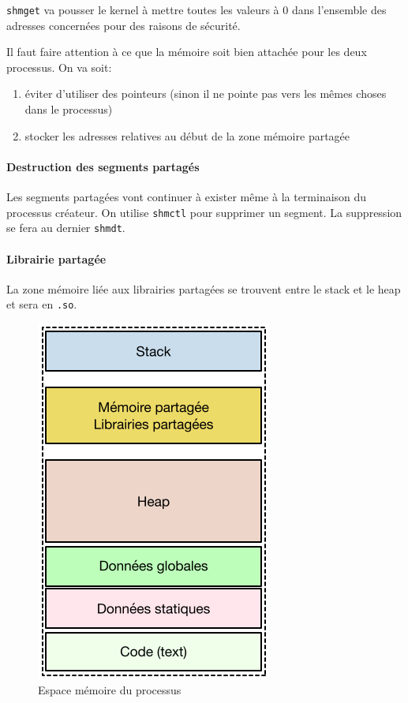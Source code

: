 \texttt{shmget} va pousser le kernel à mettre toutes les valeurs à 0
dans l'ensemble des adresses concernées pour des raisons de sécurité.

Il faut faire attention à ce que la mémoire soit bien attachée pour les
deux processus. On va soit:

\begin{enumerate}
\def\labelenumi{\arabic{enumi}.}
\tightlist
\item
  éviter d'utiliser des pointeurs (sinon il ne pointe pas vers les mêmes
  choses dans le processus)
\item
  stocker les adresses relatives au début de la zone mémoire partagée
\end{enumerate}

\paragraph{Destruction des segments
partagés}\label{destruction-des-segments-partaguxe9s}

Les segments partagées vont continuer à exister même à la terminaison du
processus créateur. On utilise \texttt{shmctl} pour supprimer un
segment. La suppression se fera au dernier \texttt{shmdt}.

\paragraph{Librairie partagée}\label{librairie-partaguxe9e}

La zone mémoire liée aux librairies partagées se trouvent entre le stack
et le heap et sera en \texttt{.so}.

\begin{figure}
\centering
\includegraphics{image-62.png}
\caption{Espace mémoire du processus}
\end{figure}

